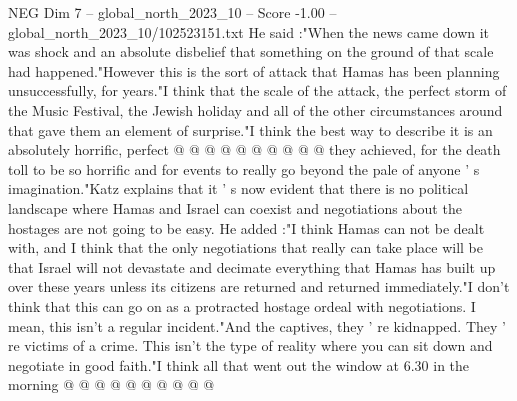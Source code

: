 \begin{textsample}{NEG Dim 7 – global\_north\_2023\_10 – Score -1.00 – global\_north\_2023\_10/102523151.txt}
He said :"When the news came down it was shock and an absolute disbelief that something on the ground of that scale had happened."However this is the sort of attack that Hamas has been planning unsuccessfully, for years."I think that the scale of the attack, the perfect storm of the Music Festival, the Jewish holiday and all of the other circumstances around that gave them an element of surprise."I think the best way to describe it is an absolutely horrific, perfect @ @ @ @ @ @ @ @ @ @ they achieved, for the death toll to be so horrific and for events to really go beyond the pale of anyone ' s imagination."Katz explains that it ' s now evident that there is no political landscape where Hamas and Israel can coexist and negotiations about the hostages are not going to be easy.
He added :"I think Hamas can not be dealt with, and I think that the only negotiations that really can take place will be that Israel will not devastate and decimate everything that Hamas has built up over these years unless its citizens are returned and returned immediately."I don't think that this can go on as a protracted hostage ordeal with negotiations.
I mean, this isn't a regular incident."And the captives, they ' re kidnapped.
They ' re victims of a crime.
This isn't the type of reality where you can sit down and negotiate in good faith."I think all that went out the window at 6.30 in the morning @ @ @ @ @ @ @ @ @ @

\end{textsample}
